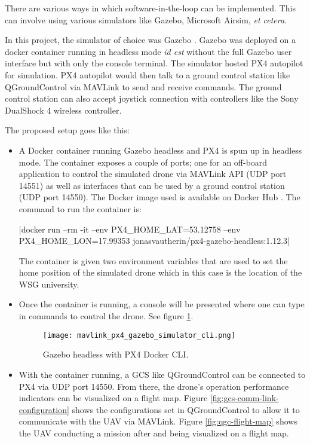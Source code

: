 There are various ways in which software-in-the-loop can be implemented. This can involve using various simulators like Gazebo, Microsoft Airsim, \textit{et cetera}.

In this project, the simulator of choice was Gazebo \cite{gazebosimulator}. Gazebo was deployed on a docker container running in headless mode \textit{id est} without the full Gazebo user interface but with only the console terminal. The simulator hosted PX4 autopilot for simulation. PX4 autopilot would then talk to a ground control station like QGroundControl via MAVLink to send and receive commands. The ground control station can also accept joystick connection with controllers like the Sony DualShock 4 wireless controller.

The proposed setup goes like this:

\begin{itemize}
    \item A Docker container running Gazebo headless and PX4 is spun up in headless mode. The container exposes a couple of ports; one for an off-board application to control the simulated drone via MAVLink API (UDP port 14551) as well as interfaces that can be used by a ground control station (UDP port 14550). The Docker image used is available on Docker Hub \cite{px4gazeboheadlesssitldockerimage}. The command to run the container is:

          |docker run --rm -it --env PX4_HOME_LAT=53.12758 --env PX4_HOME_LON=17.99353 jonasvautherin/px4-gazebo-headless:1.12.3|

          The container is given two environment variables that are used to set the home position of the simulated drone which in this case is the location of the WSG university.
    \item Once the container is running, a console will be presented where one can type in commands to control the drone. See figure \ref{fig:mavlink-px4-gazebo-simulator-cli}.
          \begin{figure}[H]
              \centering \texttt{[image: mavlink\_px4\_gazebo\_simulator\_cli.png]}
              \caption{Gazebo headless with PX4 Docker CLI.}
              \label{fig:mavlink-px4-gazebo-simulator-cli}
          \end{figure}
    \item With the container running, a GCS like QGroundControl can be connected to PX4 via UDP port 14550. From there, the drone's operation performance indicators can be visualized on a flight map. Figure \ref{fig:gcs-comm-link-configuration} shows the configurations set in QGroundControl to allow it to communicate with the UAV via MAVLink. Figure \ref{fig:qgc-flight-map} shows the UAV conducting a mission after and being visualized on a flight map.


\end{itemize}
